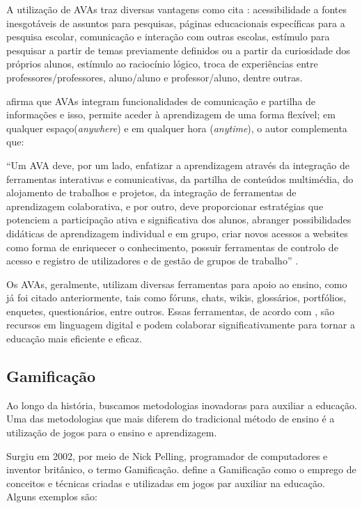 A utilização de AVAs traz diversas vantagens como cita : acessibilidade a fontes inesgotáveis de assuntos para pesquisas, páginas educacionais específicas para a pesquisa escolar, comunicação e interação com outras escolas, estímulo para pesquisar a partir de temas previamente definidos ou a partir da curiosidade dos próprios alunos, estímulo ao raciocínio lógico, troca de experiências entre professores/professores, aluno/aluno e professor/aluno, dentre outras.

 afirma que AVAs integram funcionalidades de comunicação e partilha de informações e isso, permite aceder à aprendizagem de uma forma flexível; em qualquer espaço(\textit{anywhere}) e em qualquer hora (\textit{anytime}), o autor complementa que:

\begin{citacao}
``Um AVA deve, por um lado, enfatizar a aprendizagem através da integração de ferramentas interativas e comunicativas, da partilha de conteúdos multimédia, do alojamento de trabalhos e projetos, da integração de ferramentas de aprendizagem colaborativa, e por outro, deve proporcionar estratégias que potenciem a participação ativa e significativa dos alunos, abranger possibilidades didáticas de aprendizagem individual e em grupo, criar novos acessos a websites como forma de enriquecer o conhecimento, possuir ferramentas de controlo de acesso e registro de utilizadores e de gestão de grupos de trabalho'' \cite[p.~41]{carvalho2013ambiente}. 
\end{citacao}

Os AVAs, geralmente, utilizam diversas ferramentas para apoio ao ensino, como já foi citado anteriormente, tais como fóruns, chats, wikis, glossários, portfólios, enquetes, questionários, entre outros. Essas ferramentas, de acordo com , são recursos em linguagem digital e podem colaborar significativamente para tornar a educação mais eficiente e eficaz.

\subsection{Gamificação}

Ao longo da história, buscamos metodologias inovadoras para auxiliar a educação. Uma das metodologias que mais diferem do tradicional método de ensino é a utilização de jogos para o ensino e aprendizagem. 

Surgiu em 2002, por meio de Nick Pelling, programador de computadores e inventor britânico, o termo Gamificação.  define a Gamificação como o emprego de conceitos e 
técnicas criadas e utilizadas em jogos par auxiliar na educação. Alguns exemplos s\~ao:

